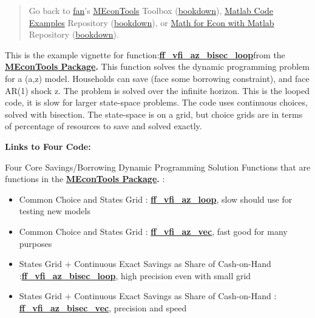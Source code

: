 \documentclass[
]{book}
\begin{document}
\begin{quote}
Go back to \href{http://fanwangecon.github.io/}{fan}'s \href{https://fanwangecon.github.io/MEconTools/}{MEconTools} Toolbox (\href{https://fanwangecon.github.io/MEconTools/bookdown}{bookdown}), \href{https://fanwangecon.github.io/M4Econ/}{Matlab Code Examples} Repository (\href{https://fanwangecon.github.io/M4Econ/bookdown}{bookdown}), or \href{https://fanwangecon.github.io/Math4Econ/}{Math for Econ with Matlab} Repository (\href{https://fanwangecon.github.io/Math4Econ/bookdown}{bookdown}).
\end{quote}

This is the example vignette for function:\href{https://github.com/FanWangEcon/MEconTools/blob/master/MEconTools/vfi/ff_vfi_az_bisec_loop.m}{\textbf{ff\_vfi\_az\_bisec\_loop}}from
the \href{https://fanwangecon.github.io/MEconTools/}{\textbf{MEconTools
Package}}\textbf{.} This function
solves the dynamic programming problem for a (a,z) model. Households can
save (face some borrowing constraint), and face AR(1) shock z. The
problem is solved over the infinite horizon. This is the looped code, it
is slow for larger state-space problems. The code uses continuous
choices, solved with bisection. The state-space is on a grid, but choice
grids are in terms of percentage of resources to save and solved
exactly.

\textbf{Links to Four Code:}

Four Core Savings/Borrowing Dynamic Programming Solution Functions that
are functions in the \href{https://fanwangecon.github.io/MEconTools/}{\textbf{MEconTools
Package}}\textbf{.} :

\begin{itemize}
\item
  Common Choice and States Grid :
  \href{https://github.com/FanWangEcon/MEconTools/blob/master/MEconTools/vfi/ff_vfi_az_loop.m}{\textbf{ff\_vfi\_az\_loop}},
  slow should use for testing new models
\item
  Common Choice and States Grid :
  \href{https://github.com/FanWangEcon/MEconTools/blob/master/MEconTools/vfi/ff_vfi_az_vec.m}{\textbf{ff\_vfi\_az\_vec}},
  fast good for many purposes
\item
  States Grid + Continuous Exact Savings as Share of Cash-on-Hand :\href{https://github.com/FanWangEcon/MEconTools/blob/master/MEconTools/vfi/ff_vfi_az_bisec_loop.m}{\textbf{ff\_vfi\_az\_bisec\_loop}},
  high precision even with small grid
\item
  States Grid + Continuous Exact Savings as Share of Cash-on-Hand :
  \href{https://github.com/FanWangEcon/MEconTools/blob/master/MEconTools/vfi/ff_vfi_az_bisec_vec.m}{\textbf{ff\_vfi\_az\_bisec\_vec}},
  precision and speed
\end{itemize}
\end{document}
